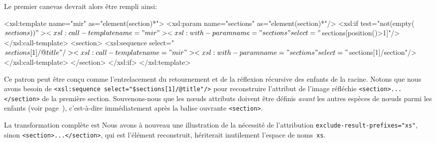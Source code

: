 Le premier canevas devrait alors être rempli ainsi:
\begin{sverb}
  <xsl:template name="mir" as="element(section)*">
    <xsl:param name="sections" as="element(section)*"/>
    <xsl:if test="not(empty($sections))">
      <xsl:call-template name="mir">
        <xsl:with-param name="sections"
                        select="$sections[position()>1]"/>
      </xsl:call-template>
      <section>
        <xsl:sequence select="$sections[1]/@title"/>
        <xsl:call-template name="mir">
          <xsl:with-param name="sections"
                          select="$sections[1]/section"/>
        </xsl:call-template>
      </section>
    </xsl:if>
  </xsl:template>
\end{sverb}
Ce patron peut être conçu comme l'entrelacement du retournement et de
la réflexion récursive des enfants de la racine. Notons que nous avons
besoin de \texttt{<xsl:sequence select="\$sections[1]/@title"/>} pour
reconstruire l'attribut de l'image réfléchie
\texttt{<section>...</section>} de la première section. Souvenons-nous
que les nœuds attributs doivent être définis \emph{avant} les
autres espèces de nœuds parmi les enfants (voir
page~\pageref{attr_before}), c'est-à-dire immédiatement après la
balise ouvrante \texttt{<section>}.

La transformation complète est
\noindent Nous avons à nouveau une illustration de la nécessité de
l'attribution \texttt{exclude-result-prefixes="xs"}, sinon
\texttt{<section>...</section>}, qui est l'élément reconstruit,
hériterait inutilement l'espace de noms~\texttt{xs}.

